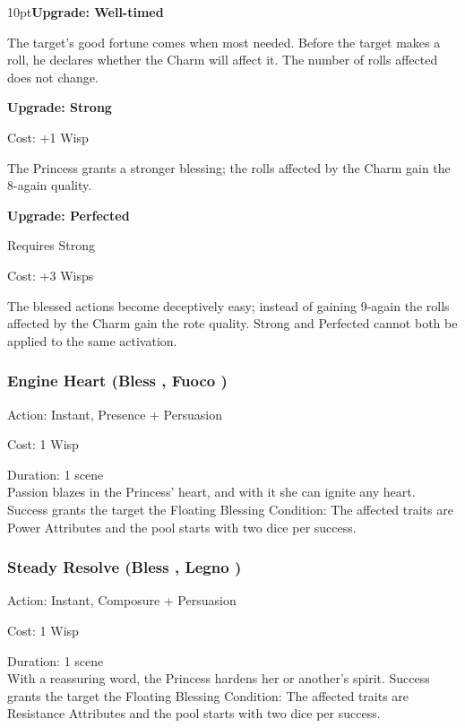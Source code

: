 \begin{myindentpar}{10pt}\textbf{Upgrade: Well-timed}

The target's good fortune comes when most needed. Before the target makes a roll, he declares whether the Charm will affect it. The number of rolls affected does not change. 

\textbf{Upgrade: Strong}

\noindent Cost: +1 Wisp

The Princess grants a stronger blessing; the rolls affected by the Charm gain the 8-again quality.

\textbf{Upgrade: Perfected}

Requires Strong

\noindent Cost: +3 Wisps

The blessed actions become deceptively easy; instead of gaining 9-again the rolls affected by the Charm gain the rote quality. Strong and Perfected cannot both be applied to the same activation.\end{myindentpar}

\subsubsection*{Engine Heart (Bless \textbullet\textbullet, Fuoco \textbullet)}

\noindent Action: Instant, Presence + Persuasion 

\noindent Cost: 1 Wisp

\noindent Duration: 1 scene \\

\noindent Passion blazes in the Princess' heart, and with it she can ignite any heart. Success grants the target the Floating Blessing Condition: The affected traits are Power Attributes and the pool starts with two dice per success. 

\subsubsection*{Steady Resolve (Bless \textbullet\textbullet, Legno \textbullet)}

\noindent Action: Instant, Composure + Persuasion 

\noindent Cost: 1 Wisp

\noindent Duration: 1 scene \\

\noindent With a reassuring word, the Princess hardens her or another's spirit. Success grants the target the Floating Blessing Condition: The affected traits are Resistance Attributes and the pool starts with two dice per success. 

